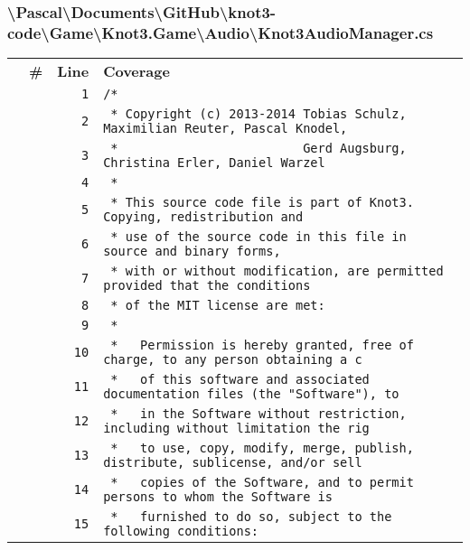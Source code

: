 \documentclass[a4paper,10pt]{article}
\begin{document}
\subsubsection{\textbackslash Pascal\textbackslash Documents\textbackslash GitHub\textbackslash knot3-code\textbackslash Game\textbackslash Knot3.Game\textbackslash Audio\textbackslash Knot3AudioManager.cs}
\begin{longtable}[l]{lrrl}
\textbf{} & \textbf{\#} & \textbf{Line} & \textbf{Coverage}\\
\cellcolor{gray} &  & \verb~1~ & \verb~/*~\\
\cellcolor{gray} &  & \verb~2~ & \verb~ * Copyright (c) 2013-2014 Tobias Schulz, Maximilian Reuter, Pascal Knodel,~\\
\cellcolor{gray} &  & \verb~3~ & \verb~ *                         Gerd Augsburg, Christina Erler, Daniel Warzel~\\
\cellcolor{gray} &  & \verb~4~ & \verb~ *~\\
\cellcolor{gray} &  & \verb~5~ & \verb~ * This source code file is part of Knot3. Copying, redistribution and~\\
\cellcolor{gray} &  & \verb~6~ & \verb~ * use of the source code in this file in source and binary forms,~\\
\cellcolor{gray} &  & \verb~7~ & \verb~ * with or without modification, are permitted provided that the conditions~\\
\cellcolor{gray} &  & \verb~8~ & \verb~ * of the MIT license are met:~\\
\cellcolor{gray} &  & \verb~9~ & \verb~ *~\\
\cellcolor{gray} &  & \verb~10~ & \verb~ *   Permission is hereby granted, free of charge, to any person obtaining a c~\\
\cellcolor{gray} &  & \verb~11~ & \verb~ *   of this software and associated documentation files (the "Software"), to ~\\
\cellcolor{gray} &  & \verb~12~ & \verb~ *   in the Software without restriction, including without limitation the rig~\\
\cellcolor{gray} &  & \verb~13~ & \verb~ *   to use, copy, modify, merge, publish, distribute, sublicense, and/or sell~\\
\cellcolor{gray} &  & \verb~14~ & \verb~ *   copies of the Software, and to permit persons to whom the Software is~\\
\cellcolor{gray} &  & \verb~15~ & \verb~ *   furnished to do so, subject to the following conditions:~\\

\end{longtable}
\end{document}

